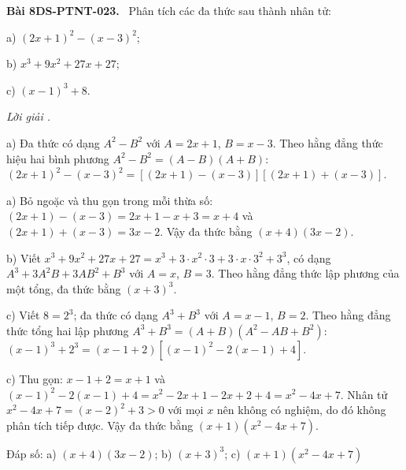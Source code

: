 \documentclass[12pt,a4paper]{article}
\newenvironment{problem}[1][]{\par\medskip\noindent\textbf{Bài #1.}\ }{\par}
\newenvironment{solution}[1][]{\par\noindent\textit{Lời giải #1.}\par}{\par}
\begin{document}
\begin{problem}[8DS-PTNT-023]
Phân tích các đa thức sau thành nhân tử:

a) $(2x + 1)^2 - (x - 3)^2$;

b) $x^3 + 9x^2 + 27x + 27$;

c) $(x - 1)^3 + 8$.

\begin{solution}
a) Đa thức có dạng $A^2 - B^2$ với $A = 2x + 1$, $B = x - 3$. Theo hằng đẳng thức hiệu hai bình phương $A^2 - B^2 = (A - B)(A + B)$: $(2x + 1)^2 - (x - 3)^2 = \left[(2x + 1) - (x - 3)\right]\left[(2x + 1) + (x - 3)\right]$.

a) Bỏ ngoặc và thu gọn trong mỗi thừa số: $(2x + 1) - (x - 3) = 2x + 1 - x + 3 = x + 4$ và $(2x + 1) + (x - 3) = 3x - 2$. Vậy đa thức bằng $(x + 4)(3x - 2)$.

b) Viết $x^3 + 9x^2 + 27x + 27 = x^3 + 3 \cdot x^2 \cdot 3 + 3 \cdot x \cdot 3^2 + 3^3$, có dạng $A^3 + 3A^2B + 3AB^2 + B^3$ với $A = x$, $B = 3$. Theo hằng đẳng thức lập phương của một tổng, đa thức bằng $(x + 3)^3$.

c) Viết $8 = 2^3$; đa thức có dạng $A^3 + B^3$ với $A = x - 1$, $B = 2$. Theo hằng đẳng thức tổng hai lập phương $A^3 + B^3 = (A + B)(A^2 - AB + B^2)$: $(x - 1)^3 + 2^3 = (x - 1 + 2)\left[(x - 1)^2 - 2(x - 1) + 4\right]$.

c) Thu gọn: $x - 1 + 2 = x + 1$ và $(x - 1)^2 - 2(x - 1) + 4 = x^2 - 2x + 1 - 2x + 2 + 4 = x^2 - 4x + 7$. Nhân tử $x^2 - 4x + 7 = (x - 2)^2 + 3 > 0$ với mọi $x$ nên không có nghiệm, do đó không phân tích tiếp được. Vậy đa thức bằng $(x + 1)(x^2 - 4x + 7)$.

Đáp số: a) $\boxed{(x + 4)(3x - 2)}$; b) $\boxed{(x + 3)^3}$; c) $\boxed{(x + 1)(x^2 - 4x + 7)}$
\end{solution}
\end{problem}
\end{document}

